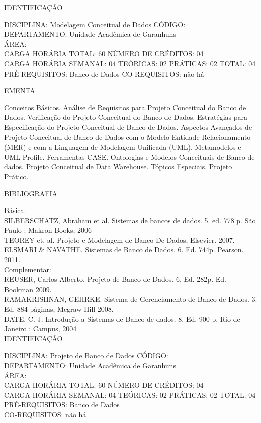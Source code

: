 \documentclass[
	12pt,				%
	openright,			%
  oneside,     %
	a4paper,			%
	chapter=TITLE,		%
	english,			%
	french,				%
	spanish,			%
	brazil				%
	]{abntex2}
\begin{document}
\begin{apendicesenv}
\newpage IDENTIFICAÇÃO

DISCIPLINA: Modelagem Conceitual de Dados CÓDIGO:\\
DEPARTAMENTO: Unidade Acadêmica de Garanhuns\\
ÁREA: \\
CARGA HORÁRIA TOTAL: 60 NÚMERO DE CRÉDITOS: 04\\
CARGA HORÁRIA SEMANAL: 04 TEÓRICAS: 02 PRÁTICAS: 02 TOTAL: 04\\
PRÉ-REQUISITOS: Banco de Dados
CO-REQUISITOS: não há

EMENTA 

Conceitos Básicos. Análise de Requisitos para Projeto Conceitual do
Banco de Dados. Verificação do Projeto Conceitual do Banco de Dados.
Estratégias para Especificação do Projeto Conceitual de Banco de Dados.
Aspectos Avançados de Projeto Conceitual de Banco de Dados com o Modelo
Entidade-Relacionamento (MER) e com a Linguagem de Modelagem Unificada
(UML). Metamodelos e UML Profile. Ferramentas CASE. Ontologias e
Modelos Conceituais de Banco de dados. Projeto Conceitual de Data
Warehouse. Tópicos Especiais. Projeto Prático.

BIBLIOGRAFIA 

Básica:\\
SILBERSCHATZ, Abraham et al. Sistemas de bancos de dados. 5. ed. 778 p.
São Paulo : Makron Books, 2006\\
TEOREY et. al.  Projeto e Modelagem de Banco De Dados, Elsevier.
2007.\\
ELSMARI \& NAVATHE. Sistemas de Banco de Dados. 6. Ed. 744p. Pearson.
2011.\\
Complementar:\\
REUSER, Carlos Alberto. Projeto de Banco de Dados. 6. Ed. 282p. Ed.
Bookman 2009.\\
RAMAKRISHNAN, GEHRKE. Sistema de Gerenciamento de Banco de Dados. 3. Ed.
884 páginas, Mcgraw Hill 2008.\\
DATE, C. J. Introdução a Sistemas de Banco de dados. 8. Ed. 900 p. Rio de Janeiro : Campus, 2004\\

\newpage IDENTIFICAÇÃO

DISCIPLINA: Projeto de Banco de Dados CÓDIGO:\\
DEPARTAMENTO: Unidade Acadêmica de Garanhuns\\
ÁREA: \\
CARGA HORÁRIA TOTAL: 60 NÚMERO DE CRÉDITOS: 04\\
CARGA HORÁRIA SEMANAL: 04 TEÓRICAS: 02 PRÁTICAS: 02 TOTAL: 04\\
PRÉ-REQUISITOS: Banco de Dados\\
CO-REQUISITOS: não há


\end{apendicesenv}
\end{document}
